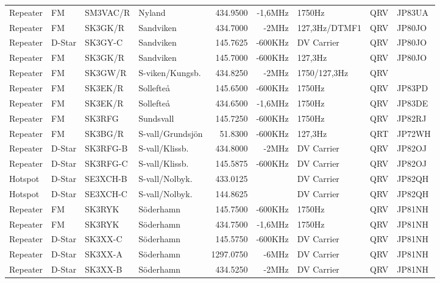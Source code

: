 \begin{landscape}
\begin{longtable}{llllrrlcl}
Repeater & FM     & SM3VAC/R & Nyland           & 434.9500  & -1,6MHz  & 1750Hz        & QRV & JP83UA \\
Repeater & FM     & SK3GK/R  & Sandviken        & 434.7000  & -2MHz    & 127,3Hz/DTMF1 & QRV & JP80JO \\
Repeater & D-Star & SK3GY-C  & Sandviken        & 145.7625  & -600KHz  & DV Carrier    & QRV & JP80JO \\
Repeater & FM     & SK3GK/R  & Sandviken        & 145.7000  & -600KHz  & 127,3Hz       & QRV & JP80JO \\
Repeater & FM     & SK3GW/R  & S-viken/Kungsb.  & 434.8250  & -2MHz    & 1750/127,3Hz  & QRV &        \\
Repeater & FM     & SK3EK/R  & Sollefteå        & 145.6500  & -600KHz  & 1750Hz        & QRV & JP83PD \\
Repeater & FM     & SK3EK/R  & Sollefteå        & 434.6500  & -1,6MHz  & 1750Hz        & QRV & JP83DE \\
Repeater & FM     & SK3RFG   & Sundsvall        & 145.7250  & -600KHz  & 1750Hz        & QRV & JP82RJ \\
Repeater & FM     & SK3BG/R  & S-vall/Grundsjön & 51.8300   & -600KHz  & 127,3Hz       & QRT & JP72WH \\
Repeater & D-Star & SK3RFG-B & S-vall/Klissb.   & 434.8000  & -2MHz    & DV Carrier    & QRV & JP82OJ \\
Repeater & D-Star & SK3RFG-C & S-vall/Klissb.   & 145.5875  & -600KHz  & DV Carrier    & QRV & JP82OJ \\
Hotspot  & D-Star & SE3XCH-B & S-vall/Nolbyk.   & 433.0125  &          & DV Carrier    & QRV & JP82QH \\
Hotspot  & D-Star & SE3XCH-C & S-vall/Nolbyk.   & 144.8625  &          & DV Carrier    & QRV & JP82QH \\
Repeater & FM     & SK3RYK   & Söderhamn        & 145.7500  & -600KHz  & 1750Hz        & QRV & JP81NH \\
Repeater & FM     & SK3RYK   & Söderhamn        & 434.7500  & -1,6MHz  & 1750Hz        & QRV & JP81NH \\
Repeater & D-Star & SK3XX-C  & Söderhamn        & 145.5750  & -600KHz  & DV Carrier    & QRV & JP81NH \\
Repeater & D-Star & SK3XX-A  & Söderhamn        & 1297.0750 & -6MHz    & DV Carrier    & QRV & JP81NH \\
Repeater & D-Star & SK3XX-B  & Söderhamn        & 434.5250  & -2MHz    & DV Carrier    & QRV & JP81NH \\

\end{longtable}
\end{landscape}
